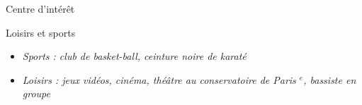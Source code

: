 \vspace{5mm}
\hspace*{-2mm}
{\fontsize{16}{10}\selectfont {} \hspace{1.5mm} Centre d'intérêt}
\newline \newline

\vspace{-5mm}
\hspace{-2mm}
{\fontsize{12}{10}\selectfont \hspace{3.8mm} Loisirs et sports}\newline
\vspace{-5mm}
\begin{itemize}
    \item[\tiny\ding{110}] \textit{Sports : club de basket-ball, ceinture noire de karaté}
    \item[\tiny\ding{110}] \textit{Loisirs : jeux vidéos, cinéma, théâtre au conservatoire de Paris $^{e}$, bassiste en groupe}
\end{itemize}